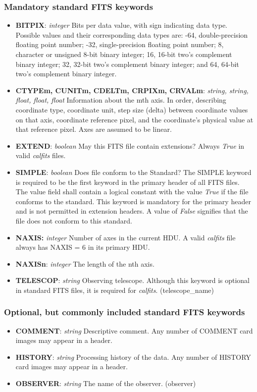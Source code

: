 \documentclass[11pt, oneside, english]{article}   	%
\begin{document}
	\subsubsection{Mandatory standard FITS keywords}
	\begin{itemize}
	\item{\textbf{BITPIX}: \emph{integer} Bits per data value, with sign indicating data type. Possible values and their corresponding data types are: -64, double-precision floating point number; -32, single-precision floating point number; 8, character or unsigned 8-bit binary integer; 16, 16-bit two’s complement binary integer; 32, 32-bit two’s complement binary integer; and 64, 64-bit two’s complement binary integer.}
	\item{\textbf{CTYPEm, CUNITm, CDELTm, CRPIXm, CRVALm}: \emph{string, string, float, float, float} Information about the mth axis. In order, describing coordinate type, coordinate unit, step size (delta) between coordinate values on that axis, coordinate reference pixel, and the coordinate's physical value at that reference pixel. Axes are assumed to be linear.}
	\item{\textbf{EXTEND}: \emph{boolean} May this FITS file contain extensions? Always \emph{True} in valid \emph{calfits} files.}
	\item{\textbf{SIMPLE}: \emph{boolean} Does file conform to the Standard? The SIMPLE keyword is required to be the first keyword in
	the primary header of all FITS files. The value field shall contain a logical constant with the value \emph{True} if the file conforms to the standard.  This keyword is mandatory for the primary header and is not permitted in extension headers.  A value of \emph{False} signifies that the file does not conform to this standard.}
	\item{\textbf{NAXIS:} \emph{integer} Number of axes in the current HDU. A valid \emph{calfits} file always has NAXIS = 6 in its primary HDU.}
	\item{\textbf{NAXISn}: \emph{integer} The length of the nth axis.}
	\item{\textbf{TELESCOP}: \emph{string} Observing telescope. Although this keyword is optional in standard FITS files, it is required for \emph{calfits}. (telescope\_name)}
	\end{itemize}
	\subsubsection{Optional, but commonly included standard FITS keywords}
	\begin{itemize}
	\item{\textbf{COMMENT}: \emph{string} Descriptive comment. Any number of COMMENT card images may
	appear in a header.}
	\item{\textbf{HISTORY}: \emph{string} Processing history of the data. Any number of HISTORY card images may appear in a header.}
	\item{\textbf{OBSERVER}: \emph{string} The name of the observer. (observer)}
	\end{itemize}
	
\end{document}
